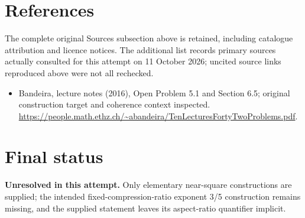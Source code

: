 \documentclass[11pt]{article}
\begin{document}
\section{References}
The complete original Sources subsection above is retained, including catalogue attribution and licence notices. The additional list records primary sources actually consulted for this attempt on 11 October 2026; uncited source links reproduced above were not all rechecked.
\begin{itemize}
\item Bandeira, lecture notes (2016), Open Problem 5.1 and Section 6.5; original construction target and coherence context inspected. \url{https://people.math.ethz.ch/~abandeira/TenLecturesFortyTwoProblems.pdf}.
\end{itemize}
\section{Final status}
\textbf{Unresolved in this attempt.} Only elementary near-square constructions are supplied; the intended fixed-compression-ratio exponent 3/5 construction remains missing, and the supplied statement leaves its aspect-ratio quantifier implicit.
\end{document}
